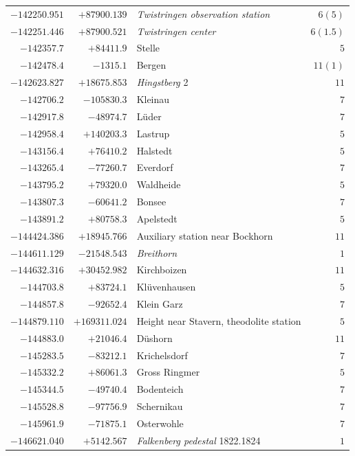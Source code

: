 \begin{center}
\begin{tabular}{r|r|p{170pt}|r}
\(-142250.951\)&\(+87900.139\)&\textit{Twistringen observation station}&\(6 (5)\)\\
\(-142251.446\)&\(+87900.521\)&\textit{Twistringen center}&\(6(1.5)\)\\
\(-142357.7\)&\(+84411.9\)&Stelle&\(5\)\\
\(-142478.4\)&\(-1315.1\)&Bergen&\(11 (1)\)\\
\(-142623.827\)&\(+18675.853\)&\textit{Hingstberg} 2&\(11\)\\
\(-142706.2\)&\(-105830.3\)&Kleinau&\(7\)\\
\(-142917.8\)&\(-48974.7\)&Lüder&\(7\)\\
\(-142958.4\)&\(+140203.3\)&Lastrup&\(5\)\\
\(-143156.4\)&\(+76410.2\)&Halstedt&\(5\)\\
\(-143265.4\)&\(-77260.7\)&Everdorf&\(7\)\\
\(-143795.2\)&\(+79320.0\)&Waldheide&\(5\)\\
\(-143807.3\)&\(-60641.2\)&Bonsee&\(7\)\\
\(-143891.2\)&\(+80758.3\)&Apelstedt&\(5\)\\
\(-144424.386\)&\(+18945.766\)&Auxiliary station near Bockhorn&\(11\)\\
\(-144611.129\)&\(-21548.543\)&\textit{Breithorn}&\(1\)\\
\(-144632.316\)&\(+30452.982\)&Kirchboizen&\(11\)\\
\(-144703.8\)&\(+83724.1\)&Klüvenhausen&\(5\)\\
\(-144857.8\)&\(-92652.4\)&Klein Garz&\(7\)\\
\(-144879.110\)&\(+169311.024\)&Height near Stavern, theodolite station&\(5\)\\
\(-144883.0\)&\(+21046.4\)&Düshorn&\(11\)\\
\(-145283.5\)&\(-83212.1\)&Krichelsdorf&\(7\)\\
\(-145332.2\)&\(+86061.3\)&Gross Ringmer&\(5\)\\
\(-145344.5\)&\(-49740.4\)&Bodenteich&\(7\)\\
\(-145528.8\)&\(-97756.9\)&Schernikau&\(7\)\\
\(-145961.9\)&\(-71875.1\)&Osterwohle&\(7\)\\
\(-146621.040\)&\(+5142.567\)&\textit{Falkenberg pedestal} 1822.1824&\(1\)\\
\hline\end{tabular}\endgroup\end{center}
